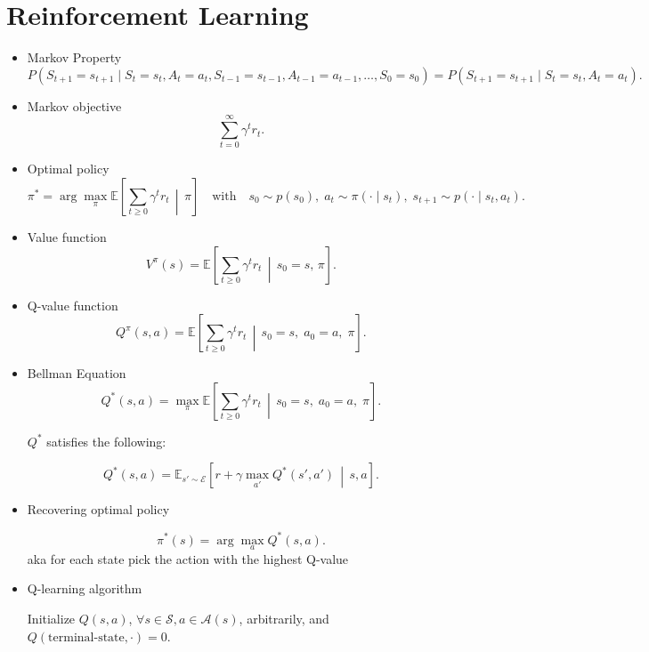 \documentclass[11pt]{article}
\begin{document}
\section{Reinforcement Learning}
\begin{itemize}
	\item Markov Property
	      \[
		      P(S_{t+1} = s_{t+1} \mid
		      S_t = s_t, A_t = a_t,
		      S_{t-1} = s_{t-1}, A_{t-1} = a_{t-1},
		      \ldots,
		      S_0 = s_0)
		      =
		      P(S_{t+1} = s_{t+1} \mid S_t = s_t, A_t = a_t).
	      \]
	\item Markov objective
	      \[
		      \sum_{t=0}^{\infty} \gamma^t r_t.
	      \]
	\item Optimal policy
	      \[
		      \pi^{*} = \arg\max_{\pi} \mathbb{E}\!\left[ \sum_{t \ge 0} \gamma^{t} r_{t} \,\middle|\, \pi \right]
		      \quad \text{with} \quad
		      s_{0} \sim p(s_{0}),\;
		      a_{t} \sim \pi(\cdot \mid s_{t}),\;
		      s_{t+1} \sim p(\cdot \mid s_{t}, a_{t}).
	      \]
	\item Value function
	      \[
		      V^{\pi}(s) =
		      \mathbb{E} \!\left[ \sum_{t \ge 0} \gamma^{t} r_t \,\middle|\, s_0 = s,\, \pi \right].
	      \]

	\item Q-value function
	      \[
		      Q^{\pi}(s, a) =
		      \mathbb{E} \!\left[ \sum_{t \ge 0} \gamma^{t} r_t \,\middle|\, s_0 = s,\; a_0 = a,\; \pi \right].
	      \]

	\item Bellman Equation
	      \[
		      Q^{*}(s, a)
		      = \max_{\pi}
		      \mathbb{E} \!\left[
			      \sum_{t \ge 0} \gamma^{t} r_t \,\middle|\,
			      s_0 = s,\; a_0 = a,\; \pi
			      \right].
	      \]

	      \(Q^{*}\) satisfies the following:

	      \[
		      Q^{*}(s, a)
		      = \mathbb{E}_{s' \sim \mathcal{E}}
		      \left[
			      r + \gamma \max_{a'} Q^{*}(s', a')
			      \,\middle|\, s, a
			      \right].
	      \]

	\item Recovering optimal policy

	      \[
		      \pi^{*}(s) = \arg\max_{a} Q^{*}(s,a).
	      \]
	      aka for each state pick the action with the highest Q-value

	\item Q-learning algorithm

	      Initialize $Q(s,a)$, $\forall s \in \mathcal{S}, a \in \mathcal{A}(s)$, arbitrarily, and
	      $Q(\text{terminal-state}, \cdot) = 0$.


\end{itemize}
\end{document}
